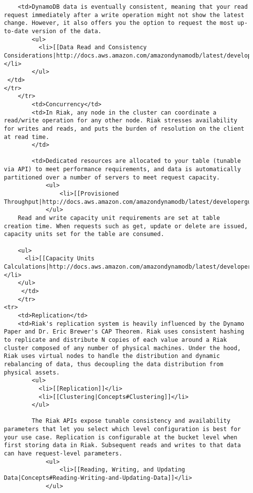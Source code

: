 \documentclass[letter]{book}
\newcounter{tab}[chapter]
\begin{document}
\begin{shaded}
\begin{verbatim}
    <td>DynamoDB data is eventually consistent, meaning that your read request immediately after a write operation might not show the latest change. However, it also offers you the option to request the most up-to-date version of the data.
        <ul>
          <li>[[Data Read and Consistency Considerations|http://docs.aws.amazon.com/amazondynamodb/latest/developerguide/APISummary.html]]</li>
        </ul>
 </td>
</tr>
    </tr>
        <td>Concurrency</td>
        <td>In Riak, any node in the cluster can coordinate a read/write operation for any other node. Riak stresses availability for writes and reads, and puts the burden of resolution on the client at read time.
        </td>

        <td>Dedicated resources are allocated to your table (tunable via API) to meet performance requirements, and data is automatically partitioned over a number of servers to meet request capacity.
            <ul>
                <li>[[Provisioned Throughput|http://docs.aws.amazon.com/amazondynamodb/latest/developerguide/ProvisionedThroughputIntro.html]]
            </ul>
    Read and write capacity unit requirements are set at table creation time. When requests such as get, update or delete are issued, capacity units set for the table are consumed.

    <ul>
      <li>[[Capacity Units Calculations|http://docs.aws.amazon.com/amazondynamodb/latest/developerguide/WorkingWithDDTables.html#CapacityUnitCalculations]]</li>
    </ul>
     </td>
    </tr>
<tr>
    <td>Replication</td>
    <td>Riak's replication system is heavily influenced by the Dynamo Paper and Dr. Eric Brewer's CAP Theorem. Riak uses consistent hashing to replicate and distribute N copies of each value around a Riak cluster composed of any number of physical machines. Under the hood, Riak uses virtual nodes to handle the distribution and dynamic rebalancing of data, thus decoupling the data distribution from physical assets.
        <ul>
          <li>[[Replication]]</li>
          <li>[[Clustering|Concepts#Clustering]]</li>
        </ul>

        The Riak APIs expose tunable consistency and availability parameters that let you select which level configuration is best for your use case. Replication is configurable at the bucket level when first storing data in Riak. Subsequent reads and writes to that data can have request-level parameters.
            <ul>
                <li>[[Reading, Writing, and Updating Data|Concepts#Reading-Writing-and-Updating-Data]]</li>
            </ul>


\end{verbatim}
\end{shaded}
\end{document}
